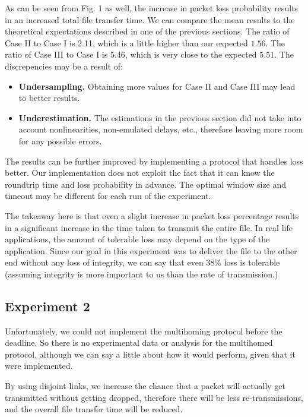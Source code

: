 \documentclass[conference]{IEEEtran}
\begin{document}
As can be seen from Fig. 1 as well, the increase in packet loss probability results in an
increased total file transfer time. We can compare the mean results to the theoretical
expectations described in one of the previous sections. The ratio of Case II to Case I
is 2.11, which is a little higher than our expected $1.56$. The ratio of Case III to Case I
is 5.46, which is very close to the expected $5.51$. The discrepencies may be a result of:

\begin{itemize}
    \item \textbf{Undersampling.} Obtaining more values for Case II and Case III may lead to
    better results.
    \item \textbf{Underestimation.} The estimations in the previous section did not take into account
    nonlinearities, non-emulated delays, etc., therefore leaving more room for any possible errors.
\end{itemize}

The results can be further improved by implementing a protocol that handles loss better. Our
implementation does not exploit the fact that it can know the roundtrip time and loss probability
in advance. The optimal window size and timeout may be different for each run of the experiment.

The takeaway here is that even a slight increase in packet loss percentage results in a significant
increase in the time taken to transmit the entire file. In real life applications, the amount of
tolerable loss may depend on the type of the application. Since our goal in this experiment was to
deliver the file to the other end without any loss of integrity, we can say that even 38\% loss is
tolerable (assuming integrity is more important to us than the rate of transmission.)

\subsection{Experiment 2}

Unfortunately, we could not implement the multihoming protocol before the deadline. So there is no
experimental data or analysis for the multihomed protocol, although we can say a little about how
it would perform, given that it were implemented.

By using disjoint links, we increase the chance that a packet will actually get transmitted without
getting dropped, therefore there will be less re-transmissions, and the overall file transfer time
will be reduced.
\end{document}
